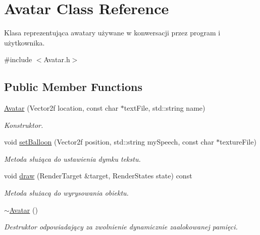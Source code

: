 \hypertarget{class_avatar}{}\section{Avatar Class Reference}
\label{class_avatar}


Klasa reprezentująca awatary używane w konwersacji przez program i użytkownika.  




{\ttfamily \#include $<$Avatar.\+h$>$}

\subsection*{Public Member Functions}
\begin{DoxyCompactItemize}
\item 
\mbox{\hyperlink{class_avatar_a87b9b3bc44f22472586f9c5a3d126d64}{Avatar}} (Vector2f location, const char $\ast$text\+File, std\+::string name)
\begin{DoxyCompactList}\small\item\em Konstruktor. \end{DoxyCompactList}\item 
void \mbox{\hyperlink{class_avatar_aff381fb315c192aa9c39030d7e722618}{set\+Balloon}} (Vector2f position, std\+::string my\+Speech, const char $\ast$texture\+File)
\begin{DoxyCompactList}\small\item\em Metoda służąca do ustawienia dymku tekstu. \end{DoxyCompactList}\item 
void \mbox{\hyperlink{class_avatar_a373c93acbda24b8fcc24919876d28932}{draw}} (Render\+Target \&target, Render\+States state) const
\begin{DoxyCompactList}\small\item\em Metoda służacą do wyrysowania obiektu. \end{DoxyCompactList}\item 
\mbox{\label{class_avatar_a0d6504f2cb45987ebfcd8736d553ec0d}} 
\mbox{\hyperlink{class_avatar_a0d6504f2cb45987ebfcd8736d553ec0d}{$\sim$\+Avatar}} ()
\begin{DoxyCompactList}\small\item\em Destruktor odpowiadający za zwolnienie dynamicznie zaalokowanej pamięci. \end{DoxyCompactList}\end{DoxyCompactItemize}
